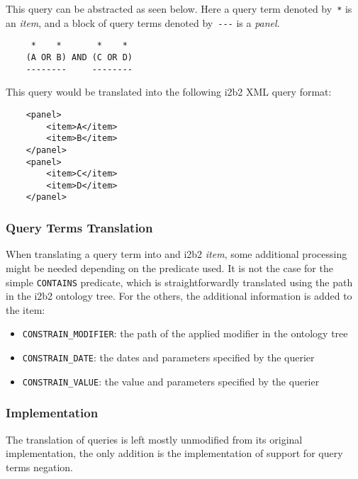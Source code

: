\begin{samepage}
This query can be abstracted as seen below.
Here a query term denoted by~\verb|*| is an \emph{item}, and a block of query terms denoted by~\verb|---| is a \emph{panel}.
\begin{verbatim}
     *    *       *    *
    (A OR B) AND (C OR D)
    --------     --------
\end{verbatim}
\end{samepage}

\begin{samepage}
This query would be translated into the following i2b2 XML query format:
\begin{verbatim}
    <panel>
        <item>A</item>
        <item>B</item>
    </panel>
    <panel>
        <item>C</item>
        <item>D</item>
    </panel>
\end{verbatim}
\end{samepage}


\subsubsection{Query Terms Translation}

When translating a query term into and i2b2 \emph{item}, some additional processing might be needed depending on the predicate used.
It is not the case for the simple \verb|CONTAINS| predicate, which is straightforwardly translated using the path in the i2b2 ontology tree.
For the others, the additional information is added to the item:

\begin{samepage}
\begin{itemize}
    \item \verb|CONSTRAIN_MODIFIER|: the path of the applied modifier in the ontology tree
    \item \verb|CONSTRAIN_DATE|: the dates and parameters specified by the querier
    \item \verb|CONSTRAIN_VALUE|: the value and parameters specified by the querier
\end{itemize}
\end{samepage}


\subsubsection{Implementation}

The translation of queries is left mostly unmodified from its original implementation, 
the only addition is the implementation of support for query terms negation.


